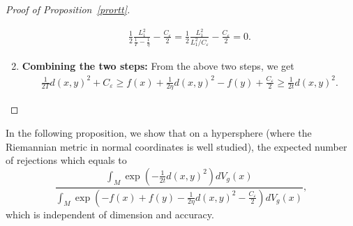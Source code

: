 \begin{proof}[Proof of Proposition~\ref{prortt}]
\begin{enumerate}
        \begin{align*}
            \frac{1}{2} \frac{L_{1}^{2}}{\frac{1}{T} - \frac{1}{\eta}} - \frac{C_{\varepsilon}}{2} 
            = \frac{1}{2} \frac{L_{1}^{2}}{L_{1}^{2}/C_{\varepsilon}} - \frac{C_{\varepsilon}}{2} = 0.
        \end{align*}    
        \item \textbf{Combining the two steps: } 
        From the above two steps, we get 
        \begin{align*}
            \frac{1}{2T} d(x, y)^{2} + C_{\varepsilon}
            \ge f(x) + \frac{1}{2\eta} d(x, y)^{2} - f(y) + \frac{C_{\varepsilon}}{2}
            \ge \frac{1}{2t} d(x, y)^{2}.
        \end{align*}
    \end{enumerate}
\end{proof}

In the following proposition, we show that on a hypersphere (where the Riemannian metric in normal coordinates is well studied), the expected number of rejections which equals to 
$$
\frac{\int_{M} \exp(-\frac{1}{2t} d(x, y)^{2}) dV_{g}(x)}{\int_{M} \exp(- f(x) + f(y) - \frac{1}{2\eta} d(x, y)^{2} - \frac{C_{\varepsilon}}{2}) dV_{g}(x)},
$$ 
which is independent of dimension and accuracy.

